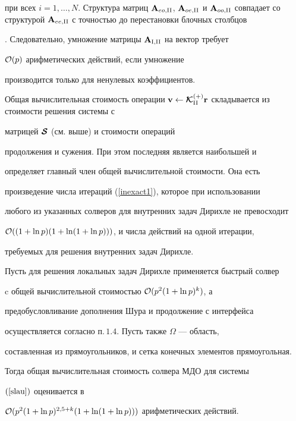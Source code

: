 при всех $i=1,\dotsc,N$. Структура матриц ${\bold A }_{eo,\rii}$, ${\bold A


}_{oe,\rii}$ и ${\bold A }_{oo,\rii}$ совпадает со структурой ${\bold A


}_{ee,\rii}$ с точностью до перестановки блочных столбцов


\cite{AGKS2002}. Следовательно, умножение матрицы ${\bold


A}_{\ri,\rii}$ на вектор требует


${\cal O}(p)$ арифметических действий, если умножение


производится только для ненулевых коэффициентов.





Общая вычислительная стоимость операции ${\bold v}\leftarrow\bi{\cal


K}_{\rii}^{(+)}{\bold r}$ складывается из стоимости решения системы с


матрицей $\boldsymbol {\cal S}$ (см. выше) и стоимости операций


продолжения и сужения. При этом последняя является наибольшей и


определяет главный член общей вычислительной стоимости. Она есть 


произведение числа итераций (\ref{inexact1}), которое при использовании 


любого из указанных солверов для внутренних задач Дирихле не превосходит


${\cal O}((1+\ln p)(1+\ln(1+\ln p)))$, и числа действий на одной итерации, 


требуемых для решения внутренних задач Дирихле.





\begin{thms}\label{T:gcost}


Пусть для решения локальных задач Дирихле применяется быстрый солвер 


c общей вычислительной стоимостью ${\cal {O}}(p^2(1+\ln p)^k)$, а 


предобусловливание дополнения Шура и продолжение с интерфейса


осуществляется согласно п.\,$1.4$. Пусть также $\Omega$ --- область,


составленная из прямоугольников, и сетка конечных элементов прямоугольная. 


Тогда общая вычислительная стоимость солвера МДО для системы 


$(\ref{slau})$ оценивается в


${\cal {O}}(p^2(1+\ln p)^{2{,}5+k}(1+\ln(1+\ln p)))$ арифметических действий.


\end{thms}





